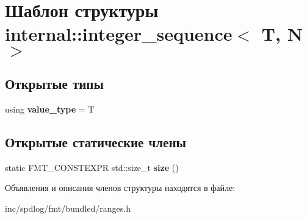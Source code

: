 \hypertarget{structinternal_1_1integer__sequence}{}\section{Шаблон структуры internal\+:\+:integer\+\_\+sequence$<$ T, N $>$}
\label{structinternal_1_1integer__sequence}
\subsection*{Открытые типы}
\begin{DoxyCompactItemize}
\item 
\mbox{\label{structinternal_1_1integer__sequence_a12d98eff4e4ae3404739d46a47b281bd}} 
using {\bfseries value\+\_\+type} = T
\end{DoxyCompactItemize}
\subsection*{Открытые статические члены}
\begin{DoxyCompactItemize}
\item 
\mbox{\label{structinternal_1_1integer__sequence_a9790e41d81dc6a30550b4a23c30a413d}} 
static F\+M\+T\+\_\+\+C\+O\+N\+S\+T\+E\+X\+PR std\+::size\+\_\+t {\bfseries size} ()
\end{DoxyCompactItemize}


Объявления и описания членов структуры находятся в файле\+:\begin{DoxyCompactItemize}
\item 
inc/spdlog/fmt/bundled/ranges.\+h\end{DoxyCompactItemize}
